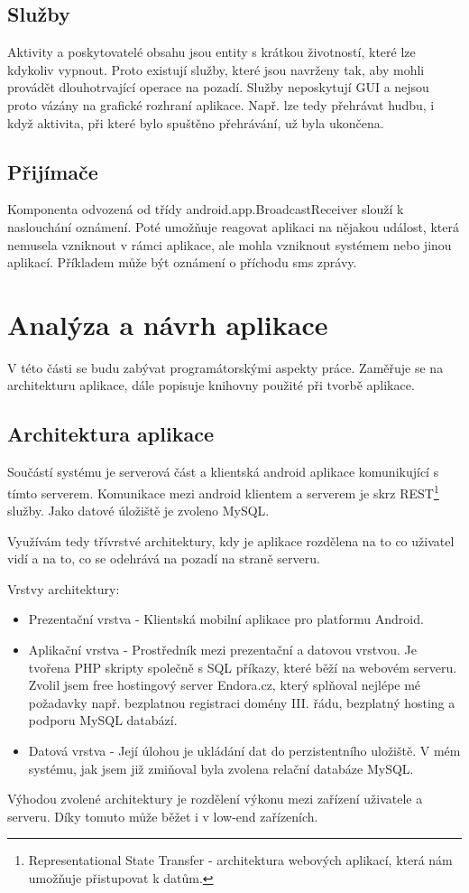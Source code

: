 \documentclass[12pt]{article}
\begin{document}
\subsection{Služby}
Aktivity a poskytovatelé obsahu jsou entity s krátkou životností, které lze kdykoliv vypnout. Proto existují služby, které jsou navrženy tak, aby mohli provádět dlouhotrvající operace na pozadí. Služby neposkytují GUI a nejsou proto vázány na grafické rozhraní aplikace. Např. lze tedy přehrávat hudbu, i když aktivita, při které bylo spuštěno přehrávání, už byla ukončena.
\subsection{Přijímače}
Komponenta odvozená od třídy android.app.BroadcastReceiver slouží k naslouchání oznámení. Poté umožňuje reagovat aplikaci na nějakou událost, která nemusela vzniknout v rámci aplikace, ale mohla vzniknout systémem nebo jinou aplikací. Příkladem může být oznámení o příchodu sms zprávy.

\section{Analýza a návrh aplikace}
V této části se budu zabývat programátorskými aspekty práce. Zaměřuje se na architekturu aplikace, dále popisuje knihovny použité při tvorbě aplikace.
\subsection{Architektura aplikace}
Součástí systému je serverová část a klientská android aplikace komunikující s tímto serverem. Komunikace mezi android klientem a serverem je skrz REST\footnote[9]{Representational State Transfer - architektura webových aplikací, která nám umožňuje přistupovat k datům.} služby. Jako datové úložiště je zvoleno MySQL.

Využívám tedy třívrstvé architektury,  kdy je aplikace rozdělena na to co uživatel vidí a na to, co se odehrává na pozadí na straně serveru.
 
Vrstvy architektury:
\begin{itemize}
\item Prezentační vrstva - Klientská mobilní aplikace pro platformu Android.
\item Aplikační vrstva - Prostředník mezi prezentační a datovou vrstvou. Je tvořena PHP skripty společně s SQL příkazy, které běží na webovém serveru. Zvolil jsem free hostingový server Endora.cz, který splňoval nejlépe mé požadavky např. bezplatnou registraci domény III. řádu, bezplatný hosting a podporu MySQL databází.
\item Datová vrstva - Její úlohou je ukládání dat do perzistentního uložiště. V mém systému, jak jsem již zmiňoval byla zvolena relační databáze MySQL.
\end{itemize}
Výhodou zvolené architektury je rozdělení výkonu mezi zařízení uživatele a serveru. Díky tomuto může běžet i v low-end zařízeních.
\end{document}
